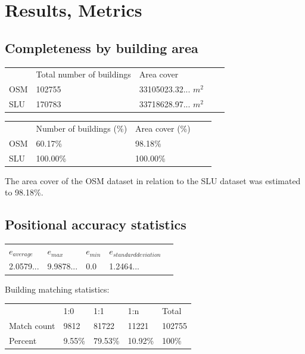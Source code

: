 \documentclass[a4paper]{article}
\begin{document}
\section{Results, Metrics}

\subsection{Completeness by building area}

\begin{table}[H]
\begin{tabular}{lllll}
    & Total number of buildings & Area cover \\
    OSM & 102755 & 33105023.32... $m^2$ \\
    SLU & 170783 & 33718628.97... $m^2$
\end{tabular}
\end{table}

\begin{table}[H]
\begin{tabular}{lllll}
    & Number of buildings (\%) & Area cover (\%) \\
    OSM & 60.17\% & 98.18\% \\
    SLU & 100.00\% & 100.00\%
\end{tabular}
\end{table}

The area cover of the OSM dataset in relation to the SLU dataset was estimated to 98.18\%.

\subsection{Positional accuracy statistics}

\begin{table}[H]
\begin{tabular}{lllll}
    $e_{average}$ & $e_{max}$ & $e_{min}$ & $e_{standard deviation}$ \\
    2.0579... & 9.9878... & 0.0 & 1.2464...
\end{tabular}
\end{table}

Building matching statistics:

\begin{table}[H]
\begin{tabular}{lllll}
    & 1:0 & 1:1 & 1:n & Total \\
    Match count & 9812   & 81722   & 11221   & 102755 \\
    Percent     & 9.55\% & 79.53\% & 10.92\% & 100\%
\end{tabular}
\end{table}
\end{document}
